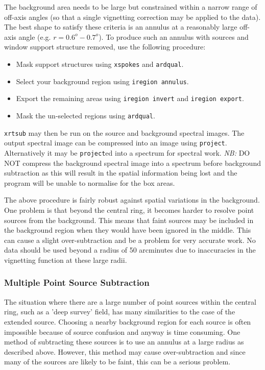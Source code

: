 \documentclass[11pt,fleqn]{article}    %
\begin{document}
The background area needs to be large but constrained within a narrow range of 
off-axis angles (so that a single vignetting correction may be applied to
the data). The best shape to satisfy these criteria is an annulus at a
reasonably large off-axis angle (e.g. $r=0.6^o - 0.7^o$). To produce such
an annulus with sources and window support structure removed, use the
following procedure:

\begin{itemize}
       \item{Mask support structures using {\tt xspokes} and {\tt ardqual}.}
       \item{Select your background region using {\tt iregion annulus}.}
       \item{Export the remaining areas using {\tt iregion invert} and
{\tt iregion export}.}
       \item{Mask the un-selected regions using {\tt ardqual}.}
\end{itemize}

{\tt xrtsub} may then be run on the source and background spectral images.
The output spectral image can be compressed into an image using
{\tt project}. Alternatively it may be {\tt project}ed into a spectrum for spectral work.
{\em NB:} DO NOT compress the background spectral image into a
spectrum before background subtraction as this will result in the 
spatial information being lost and the program will be unable to normalise for 
the box areas.

The above procedure is fairly robust against spatial variations in the
background.  One problem is that beyond the central ring, it becomes harder
to resolve point sources from the background. This means that faint
sources may be included in the background region when they would have been
ignored in the middle. This can cause a slight over-subtraction and be a
problem for very accurate work. No data should be used beyond a radius of
50 arcminutes due to inaccuracies in the vignetting function at these large
radii. 

\subsubsection{Multiple Point Source Subtraction}
The situation where there are a large number of point sources within the 
central ring, such as a 'deep survey' field, has many similarities to the
case of the extended source. Choosing a nearby background region for each 
source is often impossible because of source confusion and anyway
is time consuming. One method of subtracting these sources is to use an
annulus at a large radius as described above. However, this method may
cause over-subtraction and since many of the sources are likely to be
faint, this can be a serious problem.
\end{document}
